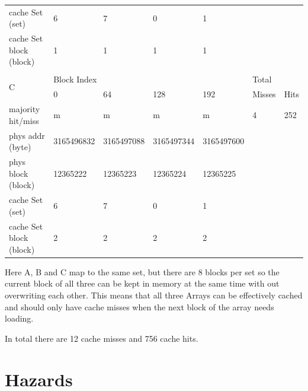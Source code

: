 \documentclass[12pt]{article}
\begin{document}
\begin{table}[H]
\begin{tabular}{lllllll}
\multicolumn{1}{l|}{cache Set (set)}         & 6          & 7          & 0          & \multicolumn{1}{l|}{1}          &               &            \\
\multicolumn{1}{l|}{cache Set block (block)} & 1          & 1          & 1          & \multicolumn{1}{l|}{1}          &               &            \\
                                             &            &            &            &                                 &               &            \\
\multicolumn{1}{l|}{\multirow{2}{*}{C}}      & \multicolumn{4}{l|}{Block Index}                                       & \multicolumn{2}{l}{Total}  \\
\multicolumn{1}{l|}{}                        & 0          & 64         & 128        & \multicolumn{1}{l|}{192}        & Misses        & Hits       \\ \hline
\multicolumn{1}{l|}{majority hit/miss}       & m          & m          & m          & \multicolumn{1}{l|}{m}          & 4             & 252        \\
\multicolumn{1}{l|}{phys addr (byte)}        & 3165496832 & 3165497088 & 3165497344 & \multicolumn{1}{l|}{3165497600} &               &            \\
\multicolumn{1}{l|}{phys block (block)}      & 12365222   & 12365223   & 12365224   & \multicolumn{1}{l|}{12365225}   &               &            \\
\multicolumn{1}{l|}{cache Set (set)}         & 6          & 7          & 0          & \multicolumn{1}{l|}{1}          &               &            \\
\multicolumn{1}{l|}{cache Set block (block)} & 2          & 2          & 2          & \multicolumn{1}{l|}{2}          &               &           
\end{tabular}
\end{table}

			
				Here A, B and C map to the same set, but there are 8 blocks per set so the current block of all three can be kept in memory at the same time with out overwriting each other. This means that all three Arrays can be effectively cached and should only have cache misses when the next block of the array needs loading.
			
				In total there are 12 cache misses and 756 cache hits.

	\section{Hazards}
\end{document}
